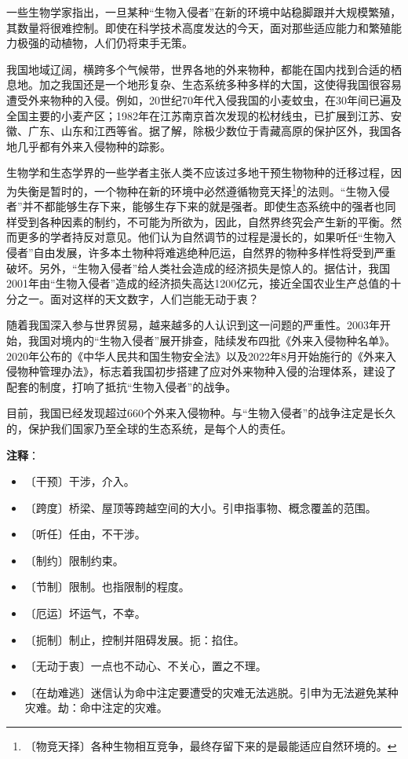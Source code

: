\documentclass[12pt,UTF-8,openany]{ctexbook}
\begin{document}
\begin{normalsize}
    一些生物学家指出，一旦某种“生物入侵者”在新的环境中站稳脚跟并大规模繁殖，其数量将很难控制。即使在科学技术高度发达的今天，面对那些适应能力和繁殖能力极强的动植物，人们仍将束手无策。
    
    我国地域辽阔，横跨多个气候带，世界各地的外来物种，都能在国内找到合适的栖息地。加之我国还是一个地形复杂、生态系统多种多样的大国，这使得我国很容易遭受外来物种的入侵。例如，20世纪70年代入侵我国的小麦蚊虫，在30年间已遍及全国主要的小麦产区；1982年在江苏南京首次发现的松材线虫，已扩展到江苏、安徽、广东、山东和江西等省。据了解，除极少数位于青藏高原的保护区外，我国各地几乎都有外来入侵物种的踪影。
    
    生物学和生态学界的一些学者主张人类不应该过多地干预生物物种的迁移过程，因为失衡是暂时的，一个物种在新的环境中必然遵循物竞天择\footnote{〔物竞天择〕各种生物相互竞争，最终存留下来的是最能适应自然环境的。}的法则。“生物入侵者”并不都能够生存下来，能够生存下来的就是强者。即使生态系统中的强者也同样受到各种因素的制约，不可能为所欲为，因此，自然界终究会产生新的平衡。然而更多的学者持反对意见。他们认为自然调节的过程是漫长的，如果听任“生物入侵者”自由发展，许多本土物种将难逃绝种厄运，自然界的物种多样性将受到严重破坏。另外，“生物入侵者”给人类社会造成的经济损失是惊人的。据估计，我国2001年由“生物入侵者”造成的经济损失高达1200亿元，接近全国农业生产总值的十分之一。面对这样的天文数字，人们岂能无动于衷？
    
    随着我国深入参与世界贸易，越来越多的人认识到这一问题的严重性。2003年开始，我国对境内的“生物入侵者”展开排查，陆续发布四批《外来入侵物种名单》。2020年公布的《中华人民共和国生物安全法》以及2022年8月开始施行的《外来入侵物种管理办法》，标志着我国初步搭建了应对外来物种入侵的治理体系，建设了配套的制度，打响了抵抗“生物入侵者”的战争。
    
    目前，我国已经发现超过660个外来入侵物种。与“生物入侵者”的战争注定是长久的，保护我们国家乃至全球的生态系统，是每个人的责任。
    
\end{normalsize}


\newpage

\textbf{注释}：

\vspace{-1em}

\begin{itemize}
    \setlength\itemsep{-0.2em}
    \item 〔干预〕干涉，介入。
    \item 〔跨度〕桥梁、屋顶等跨越空间的大小。引申指事物、概念覆盖的范围。
    \item 〔听任〕任由，不干涉。
    \item 〔制约〕限制约束。
    \item 〔节制〕限制。也指限制的程度。
    \item 〔厄运〕坏运气，不幸。
    \item 〔扼制〕制止，控制并阻碍发展。扼：掐住。
    \item 〔无动于衷〕一点也不动心、不关心，置之不理。
    \item 〔在劫难逃〕迷信认为命中注定要遭受的灾难无法逃脱。引申为无法避免某种灾难。劫：命中注定的灾难。
\end{itemize}
\end{document}
